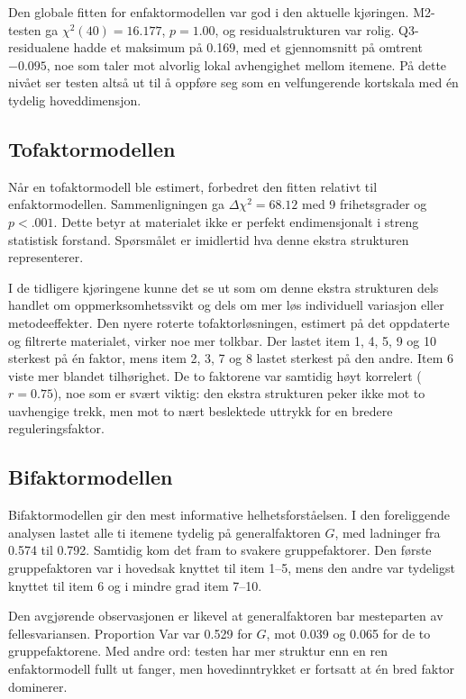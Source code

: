 \documentclass[11pt,a4paper]{article}
\begin{document}
Den globale fitten for enfaktormodellen var god i den aktuelle kjøringen. M2-testen ga $\chi^2(40)=16.177$, $p=1.00$, og residualstrukturen var rolig. Q3-residualene hadde et maksimum på 0.169, med et gjennomsnitt på omtrent $-0.095$, noe som taler mot alvorlig lokal avhengighet mellom itemene. På dette nivået ser testen altså ut til å oppføre seg som en velfungerende kortskala med én tydelig hoveddimensjon.

\subsection{Tofaktormodellen}
Når en tofaktormodell ble estimert, forbedret den fitten relativt til enfaktormodellen. Sammenligningen ga $\Delta \chi^2 = 68.12$ med 9 frihetsgrader og $p < .001$. Dette betyr at materialet ikke er perfekt endimensjonalt i streng statistisk forstand. Spørsmålet er imidlertid hva denne ekstra strukturen representerer.

I de tidligere kjøringene kunne det se ut som om denne ekstra strukturen dels handlet om oppmerksomhetssvikt og dels om mer løs individuell variasjon eller metodeeffekter. Den nyere roterte tofaktorløsningen, estimert på det oppdaterte og filtrerte materialet, virker noe mer tolkbar. Der lastet item 1, 4, 5, 9 og 10 sterkest på én faktor, mens item 2, 3, 7 og 8 lastet sterkest på den andre. Item 6 viste mer blandet tilhørighet. De to faktorene var samtidig høyt korrelert ($r = 0.75$), noe som er svært viktig: den ekstra strukturen peker ikke mot to uavhengige trekk, men mot to nært beslektede uttrykk for en bredere reguleringsfaktor.

\subsection{Bifaktormodellen}
Bifaktormodellen gir den mest informative helhetsforståelsen. I den foreliggende analysen lastet alle ti itemene tydelig på generalfaktoren $G$, med ladninger fra 0.574 til 0.792. Samtidig kom det fram to svakere gruppefaktorer. Den første gruppefaktoren var i hovedsak knyttet til item 1--5, mens den andre var tydeligst knyttet til item 6 og i mindre grad item 7--10.

Den avgjørende observasjonen er likevel at generalfaktoren bar mesteparten av fellesvariansen. Proportion Var var 0.529 for $G$, mot 0.039 og 0.065 for de to gruppefaktorene. Med andre ord: testen har mer struktur enn en ren enfaktormodell fullt ut fanger, men hovedinntrykket er fortsatt at én bred faktor dominerer.
\end{document}
